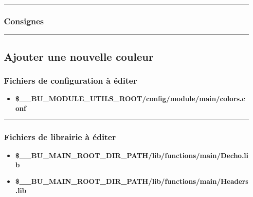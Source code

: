 \documentclass[a4paper,10pt]{article}
\begin{document}

\color{sec3}\par\noindent\rule{\textwidth}{0.4pt}\color{text}

\color{sec3}
\subsubsection{Consignes}\color{text}




\color{sec2}\par\noindent\rule{\textwidth}{0.4pt}\color{text}

\color{sec2}
\subsection{Ajouter une nouvelle couleur}\color{text}

\color{sec3}
\subsubsection{Fichiers de configuration à éditer}\color{text}

\begin{itemize}
    \item \textbf{\color{vars}\$\_\_BU\_MODULE\_UTILS\_ROOT\color{path}/config/module/main/colors.conf}\\[1\baselineskip]
\end{itemize}


\color{sec3}\par\noindent\rule{\textwidth}{0.4pt}\color{text}

\color{sec3}
\subsubsection{Fichiers de librairie à éditer}\color{text}

\begin{itemize}
    \item \textbf{\color{vars}\$\_\_BU\_MAIN\_ROOT\_DIR\_PATH\color{path}/lib/functions/main/Decho.lib}
    \item \textbf{\color{vars}\$\_\_BU\_MAIN\_ROOT\_DIR\_PATH\color{path}/lib/functions/main/Headers.lib}\\[1\baselineskip]
\end{itemize}
\end{document}
